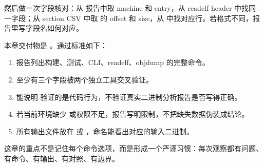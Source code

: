 然后做一次字段核对：从  报告中取 machine 和 entry，从 readelf header 中找同一字段；从 section CSV 中取  的 offset 和 size，从  中找对应行。若格式不同，报告里写字段名如何对应。


本章交付物是 。通过标准如下：

\begin{enumerate}
  \item 报告列出构建、测试、CLI、readelf、objdump 的完整命令。
  \item 至少有三个字段被两个独立工具交叉验证。
  \item 能说明  验证的是代码行为，不验证真实二进制分析报告是否写得正确。
  \item 若当前环境缺少  或权限不足，报告写明限制，不把缺失数据伪装成结论。
  \item 所有输出文件放在  或 ，命名能看出对应的输入二进制。
\end{enumerate}

这章的重点不是记住每个命令选项，而是形成一个严谨习惯：每次观察都有问题、有命令、有输出、有对照、有边界。

